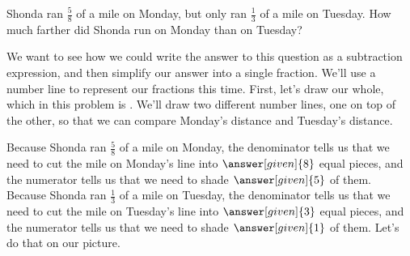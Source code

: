 \documentclass{ximera}
\begin{document}
\begin{question}
Shonda ran $\frac{5}{8}$ of a mile on Monday, but only ran $\frac{1}{3}$ of a mile on Tuesday. How much farther did Shonda run on Monday than on Tuesday?

\begin{explanation}

We want to see how we could write the answer to this question as a subtraction expression, and then simplify our answer into a single fraction. We'll use a number line to represent our fractions this time. First, let's draw our whole, which in this problem is . We'll draw two different number lines, one on top of the other, so that we can compare Monday's distance and Tuesday's distance.

\begin{image}
\end{image}

Because Shonda ran $\frac{5}{8}$ of a mile on Monday, the denominator tells us that we need to cut the mile on Monday's line into $\answer[given]{8}$ equal pieces, and the numerator tells us that we need to shade $\answer[given]{5}$ of them. Because Shonda ran $\frac{1}{3}$ of a mile on Tuesday, the denominator tells us that we need to cut the mile on Tuesday's line into $\answer[given]{3}$ equal pieces, and the numerator tells us that we need to shade $\answer[given]{1}$ of them. Let's do that on our picture. %


\end{explanation}
\end{question}
\end{document}
